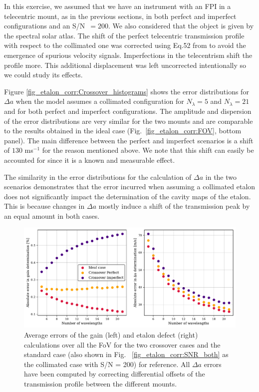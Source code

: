 In this exercise, we assumed that we have an instrument with an FPI in a telecentric mount, as in the previous sections, in both perfect and imperfect configurations and an S/N~$=200$. We also considered that the object is given by the spectral solar atlas. The shift of the perfect telecentric transmission profile with respect to the collimated one was corrected using Eq.52 from \cite{franI} to avoid the emergence of spurious velocity signals. Imperfections in the telecentrism shift the profile more. This additional displacement was left uncorrected intentionally so we could study its effects.

Figure \ref{fig_etalon_corr:Crossover_histograms} shows the error distributions for $\Delta a$ when the model assumes a collimated configuration for $N_\lambda=5$ and $N_\lambda=21$ and for both perfect and imperfect configurations. The amplitude and dispersion of the error distributions are very similar for the two mounts and are comparable to the results obtained in the ideal case (Fig.~\ref{fig_etalon_corr:FOV}, bottom panel). The main difference between the perfect and imperfect scenarios is a shift of $130$ ms$^{-1}$ for the reason mentioned above. We note that this shift can easily be accounted for since it is a known and measurable effect. 

The similarity in the error distributions for the calculation of $\Delta a$ in the two scenarios demonstrates that the error incurred when assuming a collimated etalon does not significantly impact the determination of the cavity maps of the etalon. This is because changes in $\Delta a$ mostly induce a shift of the transmission peak by an equal amount in both cases.

\begin{figure}
  \includegraphics[width=\textwidth]{figures/EtalonPaper/means.pdf}
  \caption{Average errors of the gain (left) and etalon defect (right) calculations over all the FoV for the two crossover cases and the standard case (also shown in Fig.~ \ref{fig_etalon_corr:SNR_both} as the collimated case with S/N = 200) for reference. All $\Delta a$ errors have been computed by correcting differential offsets of the transmission profile between the different mounts.\label{fig_etalon_corr:crossover}}  
\end{figure}

